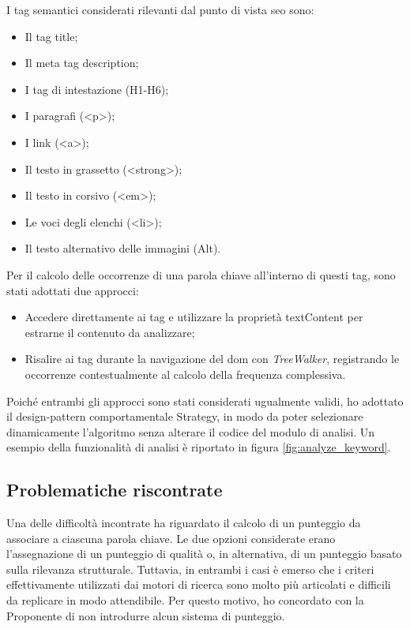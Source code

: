 \vspace{10pt}
\par\noindent I tag semantici considerati rilevanti dal punto di vista \gls{seo} sono:
\begin{itemize}
  \item Il tag title;
  \item Il meta tag description;
  \item I tag di intestazione (H1-H6);
  \item I paragrafi (<p>);
  \item I link (<a>);
  \item Il testo in grassetto (<strong>);
  \item Il testo in corsivo (<em>);
  \item Le voci degli elenchi (<li>);
  \item Il testo alternativo delle immagini (Alt).
\end{itemize}

\vspace{5pt}
\par\noindent Per il calcolo delle occorrenze di una parola chiave all’interno di questi tag, sono stati adottati due approcci:
\begin{itemize}
  \item Accedere direttamente ai tag e utilizzare la proprietà textContent per estrarne il contenuto da analizzare;
  \item Risalire ai tag durante la navigazione del \gls{dom} con \textit{TreeWalker}, registrando le occorrenze contestualmente al calcolo della frequenza complessiva.
\end{itemize}

\vspace{5pt}
\par\noindent Poiché entrambi gli approcci sono stati considerati ugualmente validi, ho adottato il \gls{design-pattern} comportamentale Strategy, in modo da poter selezionare dinamicamente l’algoritmo senza alterare il codice del modulo di analisi. Un esempio della funzionalità di analisi è riportato in figura \ref{fig:analyze_keyword}.

\subsection{Problematiche riscontrate}

\par Una delle difficoltà incontrate ha riguardato il calcolo di un punteggio da associare a ciascuna parola chiave. Le due opzioni considerate erano l’assegnazione di un punteggio di qualità o, in alternativa, di un punteggio basato sulla rilevanza strutturale. Tuttavia, in entrambi i casi è emerso che i criteri effettivamente utilizzati dai motori di ricerca sono molto più articolati e difficili da replicare in modo attendibile. Per questo motivo, ho concordato con la Proponente di non introdurre alcun sistema di punteggio.

